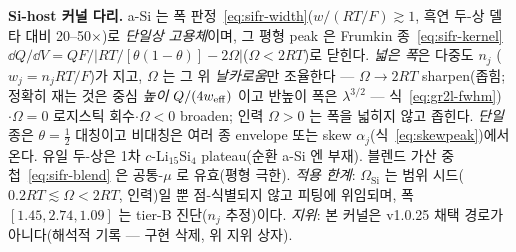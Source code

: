 \begin{keybox}
\textbf{Si-host 커널 다리.} a-Si 는 폭 판정~\eqref{eq:sifr-width}($w/(RT/F)\gtrsim1$, 흑연 두-상 델타 대비
20--50$\times$)로 \emph{단일상 고용체}이며, 그 평형 peak 은 Frumkin 종~\eqref{eq:sifr-kernel}
$\dd Q/\dd V=QF/|RT/[\theta(1-\theta)]-2\Omega|$($\Omega<2RT$)로 닫힌다. \emph{넓은 폭}은 다중도 $n_j$
($w_j{=}n_jRT/F$)가 지고, $\Omega$ 는 그 위 \emph{날카로움}만 조율한다 --- $\Omega{\to}2RT$ sharpen(좁힘;
정확히 재는 것은 중심 \emph{높이} $Q/(4w_{\mathrm{eff}})$ 이고 반높이 폭은 $\lambda^{3/2}$ --- 식~\eqref{eq:gr2l-fwhm})
$\cdot\Omega{=}0$ 로지스틱 회수$\cdot\Omega<0$ broaden; 인력 $\Omega{>}0$ 는 폭을 넓히지 않고 좁힌다. \emph{단일} 종은
$\theta{=}\tfrac12$ 대칭이고 비대칭은 여러 종 envelope 또는 skew $\alpha_j$(식~\eqref{eq:skewpeak})에서 온다.
유일 두-상은 1차 $c$-Li$_{15}$Si$_4$
plateau(순환 a-Si 엔 부재). 블렌드 가산 중첩~\eqref{eq:sifr-blend} 은 공통-$\mu$ 로 유효(평형 극한).
\emph{적용 한계}: $\Omega_\mathrm{Si}$ 는 범위 시드($0.2RT\lesssim\Omega<2RT$, 인력)일 뿐 점-식별되지 않고
피팅에 위임되며, 폭 $[1.45,2.74,1.09]$ 는 tier-B 진단($n_j$ 추정)이다.
\emph{지위}: 본 커널은 v1.0.25 채택 경로가 아니다(해석적 기록 --- 구현 삭제, 위 지위 상자).
\end{keybox}

